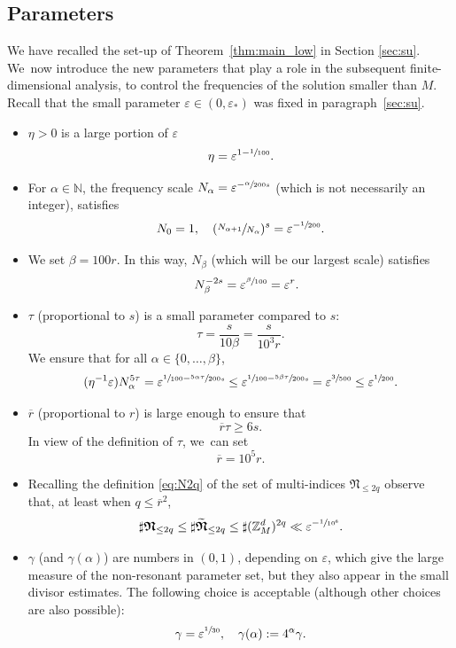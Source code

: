 \documentclass[JEP,XML,SOM,Unicode,published]{cedram}
\theoremstyle{plain}
\theoremstyle{definition}
\newcommand{\Nb}{{\boldsymbol{\mathfrak{N}}}}
\newcommand{\N}{\mathbb{N}}
\newcommand{\Z}{\mathbb{Z}}
\newcommand{\1}{\mathbf{1}}
\let\epsilon\varepsilon
\begin{document}
\subsection{Parameters}
\label{sec:par}
We have recalled the set-up of Theorem~\ref{thm:main_low} in Section \ref{sec:su}. We~now introduce the new parameters that play a role in the subsequent finite-dimensional analysis, to control the frequencies of the solution smaller than $M$. Recall that the small parameter $\epsilon\in(0,\epsilon_{\ast})$ was fixed in paragraph~\eqref{sec:su}.
\begin{itemize}
\item $\eta>0$ is a large portion of $\epsilon$
\[
\eta = \epsilon^{1-\sfrac{1}{100}}.
\]
\item For $\alpha\in\N$, the frequency scale $N_{\alpha}=\epsilon^{-\sfrac{\alpha}{200s}}$ (which is not necessarily an integer), satisfies
\[
N_{0}=1,\quad (\sfrac{N_{\alpha+1}}{N_{\alpha}})^{s} = \epsilon^{-\sfrac{1}{200}}.
\]
\item We set $\beta = 100r$. In this way, $N_{\beta}$ (which will be our largest scale) satisfies
\begin{equation}
\label{eq:s-beta}
\quad N_{\beta}^{-2s} = \epsilon^{\sfrac{\beta}{100}} = \epsilon^{r}.
\end{equation}
\item $\tau$ (proportional to $s$) is a small parameter compared to $s$:
\[
\tau = \frac{s}{10\beta} = \frac{s}{10^{3}r}.
\]
We ensure that for all $\alpha\in\{0,\dots,\beta\}$,
\begin{equation}
\label{eq:eta-tau}
(\eta^{-1}\epsilon) N_{\alpha}^{5\tau} = \epsilon^{\sfrac{1}{100}-\sfrac{5\alpha\tau}{200s}} \leq \epsilon^{\sfrac{1}{100}-\sfrac{5\beta \tau}{200s}} = \epsilon^{\sfrac{3}{500}}\leq \epsilon^{\sfrac{1}{200}}.
\end{equation}
\item $\overline{r}$ (proportional to $r$) is large enough to ensure that
\begin{equation}
\label{eq:r-bar}
\overline{r}\tau \geq 6s.
\end{equation}
In view of the definition of $\tau$, we~can set
\[
\overline{r}=10^{5}r.
\]
\item Recalling the definition \eqref{eq:N2q} of the set of multi-indices $\Nb_{\leq2q}$ observe that, at least when $q\leq\overline{r}^{2}$,
\begin{equation}
\label{eq:counting}
\sharp\Nb_{\leq2q}\leq \sharp\widetilde{\Nb}_{\leq 2q}\leq \sharp(\Z_{M}^{d})^{2q}\ll \epsilon^{-\sfrac{1}{10^{6}}}.
\end{equation}
\item $\gamma$ (and $\gamma(\alpha)$) are numbers in $(0,1)$, depending on $\epsilon$, which give the large measure of the non-resonant parameter set, but they also appear in the small divisor estimates. The following choice is acceptable (although other choices are also possible):
\begin{equation}
\label{eq:gamma}
\gamma = \epsilon^{\sfrac{1}{30}},\quad \gamma(\alpha) :=4^{\alpha}\gamma.
\end{equation}
\end{itemize}
\end{document}
